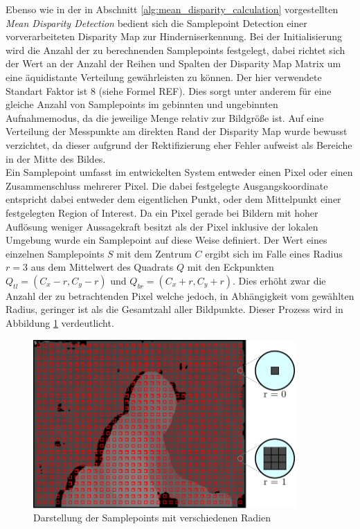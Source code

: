 \noindent
Ebenso wie in der in Abschnitt \ref{alg:mean_disparity_calculation} vorgestellten \emph{Mean Disparity Detection} bedient sich die Samplepoint Detection einer vorverarbeiteten Disparity Map zur Hinderniserkennung. Bei der Initialisierung wird die Anzahl der zu berechnenden Samplepoints festgelegt, dabei richtet sich der Wert an der Anzahl der Reihen und Spalten der Disparity Map Matrix um eine äquidistante Verteilung gewährleisten zu können. Der hier verwendete Standart Faktor ist 8 (siehe Formel REF). Dies sorgt unter anderem für eine gleiche Anzahl von Samplepoints im gebinnten und ungebinnten Aufnahmemodus, da die jeweilige Menge relativ zur Bildgröße ist. Auf eine Verteilung der Messpunkte am direkten Rand der Disparity Map wurde bewusst verzichtet, da dieser aufgrund der Rektifizierung eher Fehler aufweist als Bereiche in der Mitte des Bildes.\\

\noindent
Ein Samplepoint umfasst im entwickelten System entweder einen Pixel oder einen Zusammenschluss mehrerer Pixel. Die dabei festgelegte Ausgangskoordinate entspricht dabei entweder dem eigentlichen Punkt, oder dem Mittelpunkt einer festgelegten Region of Interest. Da ein Pixel gerade bei Bildern mit hoher Auflösung weniger Aussagekraft besitzt als der Pixel inklusive der lokalen Umgebung wurde ein Samplepoint auf diese Weise definiert. Der Wert eines einzelnen Samplepoints $S$ mit dem Zentrum $C$ ergibt sich im Falle eines Radius $r=3$ aus dem Mittelwert des Quadrats $Q$ mit den Eckpunkten $Q_{tl} = (C_x - r, C_y -r)$ und $Q_{br} = (C_x + r, C_y +r)$. Dies erhöht zwar die Anzahl der zu betrachtenden Pixel welche jedoch, in Abhängigkeit vom gewählten Radius, geringer ist als die Gesamtzahl aller Bildpunkte. Dieser Prozess wird in Abbildung \ref{fig:samplepoints_initmodes} verdeutlicht.\\

\begin{figure}[h]
	\begin{center}
		\includegraphics[width=10cm]{img/samplepoints_initmodes.pdf}
	\end{center}
	\caption{Darstellung der Samplepoints mit verschiedenen Radien}
	\label{fig:samplepoints_initmodes}
\end{figure}

